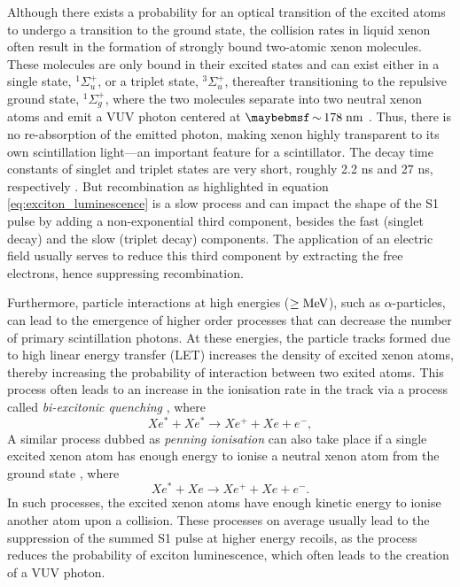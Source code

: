 Although there exists a probability for an optical transition of the excited atoms to undergo a transition to the ground state, the collision rates in liquid xenon often result in the formation of strongly bound two-atomic xenon molecules. These molecules are only bound in their excited states and can exist either in a single state, $^{1}\Sigma^{+}_{u}$, or a triplet state, $^{3}\Sigma^{+}_{u}$, thereafter transitioning to the repulsive ground state, $^{1}\Sigma^{+}_{g}$, where the two molecules separate into two neutral xenon atoms and emit a VUV photon centered at $\sim 178 \; \MathText{nm}$ \cite{FUJII2015293}. Thus, there is no re-absorption of the emitted photon, making xenon highly transparent to its own scintillation light---an important feature for a scintillator. The decay time constants of singlet and triplet states are very short, roughly 2.2 ns and 27 ns, respectively \cite{xenon_physics}. But recombination as highlighted in equation \ref{eq:exciton_luminescence} is a slow process and can impact the shape of the S1 pulse by adding a non-exponential third component, besides the fast (singlet decay) and the slow (triplet decay) components. The application of an electric field usually serves to reduce this third component by extracting the free electrons, hence suppressing recombination.

Furthermore, particle interactions at high energies ($\geq{}\text{MeV}$), such as $\alpha$-particles, can lead to the emergence of higher order processes that can decrease the number of primary scintillation photons. At these energies, the particle tracks formed due to high linear energy transfer (LET) increases the density of excited xenon atoms, thereby increasing the probability of interaction between two exited atoms. This process often leads to an increase in the ionisation rate in the track via a process called \textit{bi-excitonic quenching} \cite{bi_excitonic}, where
%
\begin{equation} \label{eq:bi-excitonic_quenching}
    Xe^{\ast} + Xe^{\ast} \rightarrow Xe^{+} + Xe + e^{-},
\end{equation} 
%
A similar process dubbed as \textit{penning ionisation} can also take place if a single excited xenon atom has enough energy to ionise a neutral xenon atom from the ground state
\cite{Dahl}, where
%
\begin{equation} \label{eq:bi-excitonic_quenching}
    Xe^{\ast} + Xe \rightarrow Xe^{+} + Xe + e^{-}.
\end{equation} 
%
In such processes, the excited xenon atoms have enough kinetic energy to ionise another atom upon a collision. These processes on average usually lead to the suppression of the summed S1 pulse at higher energy recoils, as the process reduces the probability of exciton luminescence, which often leads to the creation of a VUV photon.


